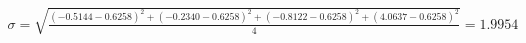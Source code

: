 \documentclass[preview]{standalone}
\begin{document}
\begin{align*}
\sigma = \sqrt{\frac{(-0.5144 - 0.6258)^2 + (-0.2340 - 0.6258)^2 + (-0.8122 - 0.6258)^2 + (4.0637 - 0.6258)^2}{4}} = 1.9954
\end{align*}
\end{document}
